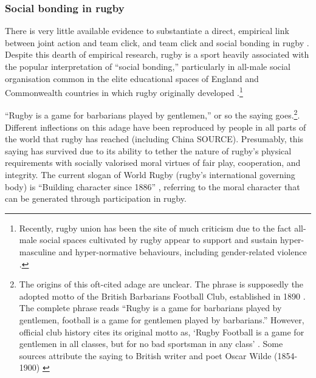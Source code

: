 \begin{CJK}{UTF8}{gbsn}
\subsubsection{Social bonding in rugby}
There is very little available evidence to substantiate a direct, empirical link between joint action and team click, and team click and social bonding in rugby \citep[but for a discussion, see][]{Davis2015}.  Despite this dearth of empirical research, rugby is a sport heavily associated with the popular interpretation of ``social bonding,'' particularly in all-male social organisation common in the elite educational spaces of England and Commonwealth countries in which rugby originally developed \citep{Dunning2005,Richards2007,Collins2008}.\footnote{Recently, rugby union has been the site of much criticism due to the fact all-male social spaces cultivated by rugby appear to support and sustain hyper-masculine and hyper-normative behaviours, including gender-related violence \citep{Cosslett2014}.}

``Rugby is a game for barbarians played by gentlemen,'' or so the saying goes.\footnote{The origins of this oft-cited adage are unclear.  The phrase is supposedly the adopted motto of the British Barbarians Football Club, established in 1890 \citep[34]{Dunning2005}.  The complete phrase reads ``Rugby is a game for barbarians played by gentlemen, football is a game for gentlemen played by barbarians.''  However, official club history cites its original motto as, ‘Rugby Football is a game for gentlemen in all classes, but for no bad sportsman in any class' \citep[vii]{Starmer-Smith1977}.  Some sources attribute the saying to British writer and poet Oscar Wilde (1854-1900) \citep{Fleenor2015}}. Different inflections on this adage have been reproduced by people in all parts of the world that rugby has reached (including China SOURCE). Presumably, this saying has survived due to its ability to tether the nature of rugby's physical requirements with socially valorised moral virtues of fair play, cooperation, and integrity.  The current slogan of World Rugby (rugby's international governing body) is ``Building character since 1886'' \citep{WorldRugby2017}, referring to the moral character that can be generated through participation in rugby.


\end{CJK}
